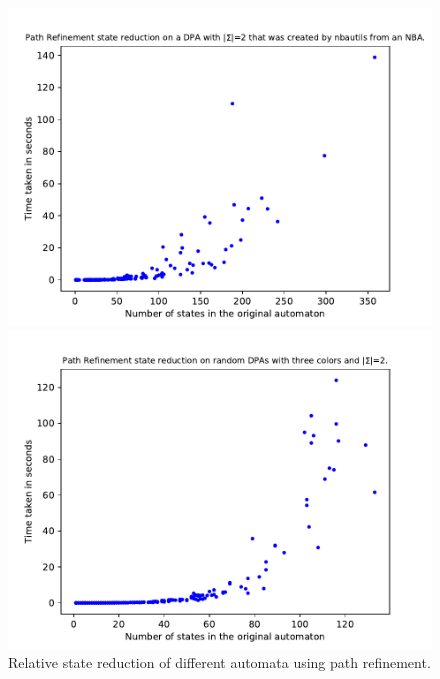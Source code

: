 \begin{figure}
\begin{minipage}{0.49\textwidth}
		\includegraphics[page=6,height=.3\textheight]{../data/analysis/path_refinement/detnbaut_ap1.pdf} 
		\caption{Relative state reduction of different automata using path refinement.}
		\label{exp:fig:path_refinement_size_hist}
	\end{minipage}
	\hfill
	\begin{minipage}{0.49\textwidth}
		\includegraphics[page=2,height=.3\textheight]{../data/analysis/path_refinement/gendet_ap1.pdf} 

\end{minipage}
\end{figure}
